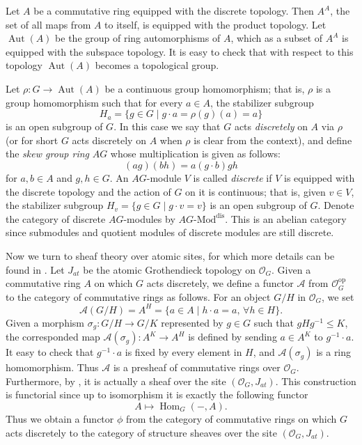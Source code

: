 \documentclass[11pt, reqno]{amsart}
\theoremstyle{plain}
\numberwithin{equation}{section}
\theoremstyle{definition}
\newcommand{\Mod}{{\textrm{-}\mathrm{Mod}}}
\DeclareMathOperator{\Aut}{Aut}
\DeclareMathOperator{\Hom}{Hom}
\newcommand{\op}{{\mathrm{op}}}
\newcommand{\dis}{{\mathrm{dis}}}
\begin{document}
Let $A$ be a commutative ring equipped with the discrete topology. Then $A^A$, the set of all maps from $A$ to itself, is equipped with the product topology. Let $\Aut(A)$ be the group of ring automorphisms of $A$, which as a subset of $A^A$ is equipped with the subspace topology. It is easy to check that with respect to this topology $\Aut(A)$ becomes a topological group.

Let $\rho: G \to \Aut(A)$ be a continuous group homomorphism; that is, $\rho$ is a group homomorphism such that for every $a \in A$, the stabilizer subgroup
\[
H_a = \{ g \in G \mid g \cdot a = \rho (g)(a) = a \}
\]
is an open subgroup of $G$. In this case we say that $G$ acts \textit{discretely} on $A$ via $\rho$ (or for short $G$ acts discretely on $A$ when $\rho$ is clear from the context), and define the \textit{skew group ring} $AG$ whose multiplication is given as follows:
\[
(ag) (bh) = a (g \cdot b) gh
\]
for $a, b \in A$ and $g, h \in G$. An $AG$-module $V$ is called \textit{discrete} if $V$ is equipped with the discrete topology and the action of $G$ on it is continuous; that is, given $v \in V$, the stabilizer subgroup $H_v = \{ g \in G \mid g \cdot v = v \}$ is an open subgroup of $G$. Denote the category of discrete $AG$-modules by $AG \Mod^{\dis}$. This is an abelian category since submodules and quotient modules of discrete modules are still discrete.

Now we turn to sheaf theory over atomic sites, for which more details can be found in \cite[Section 2]{DLLX}. Let $J_{at}$ be the atomic Grothendieck topology on $\mathcal{O}_G$. Given a commutative ring $A$ on which $G$ acts discretely, we define a functor $\mathcal{A}$ from $\mathcal{O}_G^{\op}$ to the category of commutative rings as follows. For an object $G/H$ in $\mathcal{O}_G$, we set
\[
\mathcal{A}(G/H) = A^H = \{a \in A \mid h \cdot a = a, \, \forall h \in H \}.
\]
Given a morphism $\sigma_g: G/H \to G/K$ represented by $g \in G$ such that $gHg^{-1} \leqslant K$, the corresponded map $\mathcal{A}(\sigma_g): A^K \to A^H$ is defined by sending $a \in A^K$ to $g^{-1} \cdot a$. It easy to check that $g^{-1} \cdot a$ is fixed by every element in $H$, and $\mathcal{A}(\sigma_g)$ is a ring homomorphism. Thus $\mathcal{A}$ is a presheaf of commutative rings over $\mathcal{O}_G$. Furthermore, by \cite[Thereom III.9.1]{MM}, it is actually a sheaf over the site $(\mathcal{O}_G, J_{at})$. This construction is functorial since up to isomorphism it is exactly the following functor
\[
A \mapsto \Hom_G(-, A).
\]
Thus we obtain a functor $\phi$ from the category of commutative rings on which $G$ acts discretely to the category of structure sheaves over the site $(\mathcal{O}_G, J_{at})$.
\end{document}

